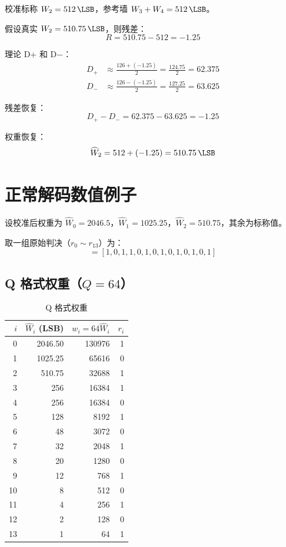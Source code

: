 \documentclass[
  UTF8,
  a4paper,
  11pt,
  oneside,
  fontset=fandol
]{ctexrep}
\newcommand{\What}{\widehat{W}}
\begin{document}
校准标称 $W_2 = \SI{512}{\LSB}$，参考墙 $W_3 + W_4 = \SI{512}{\LSB}$。

假设真实 $W_2 = \SI{510.75}{\LSB}$，则残差：
\begin{equation}
R = 510.75 - 512 = -1.25
\end{equation}

理论 D+ 和 D$-$：
\begin{align}
D_+ &\approx \frac{126 + (-1.25)}{2} = \frac{124.75}{2} = 62.375 \\
D_- &\approx \frac{126 - (-1.25)}{2} = \frac{127.25}{2} = 63.625
\end{align}

残差恢复：
\begin{equation}
D_+ - D_- = 62.375 - 63.625 = -1.25
\end{equation}

权重恢复：
\begin{equation}
\What_2 = 512 + (-1.25) = \SI{510.75}{\LSB}
\end{equation}

\section{正常解码数值例子}

设校准后权重为 $\What_0 = 2046.5$，$\What_1 = 1025.25$，$\What_2 = 510.75$，其余为标称值。

取一组原始判决（$r_0 \sim r_{13}$）为：
\begin{equation}
[r_0, \ldots, r_{13}] = [1, 0, 1, 1, 0, 1, 0, 1, 0, 1, 0, 1, 0, 1]
\end{equation}

\subsection{Q 格式权重（$Q = 64$）}

\begin{table}[H]
\centering
\caption{Q 格式权重}
\label{tab:qweights}
\small
\begin{tabularx}{\textwidth}{r r r r}
\toprule
$i$ & $\What_i$ (LSB) & $w_i = 64\What_i$ & $r_i$ \\
\midrule
0  & 2046.50 & 130976 & 1 \\
1  & 1025.25 &  65616 & 0 \\
2  &  510.75 &  32688 & 1 \\
3  &   256   &  16384 & 1 \\
4  &   256   &  16384 & 0 \\
5  &   128   &   8192 & 1 \\
6  &    48   &   3072 & 0 \\
7  &    32   &   2048 & 1 \\
8  &    20   &   1280 & 0 \\
9  &    12   &    768 & 1 \\
10 &     8   &    512 & 0 \\
11 &     4   &    256 & 1 \\
12 &     2   &    128 & 0 \\
13 &     1   &     64 & 1 \\
\bottomrule
\end{tabularx}
\end{table}
\end{document}

